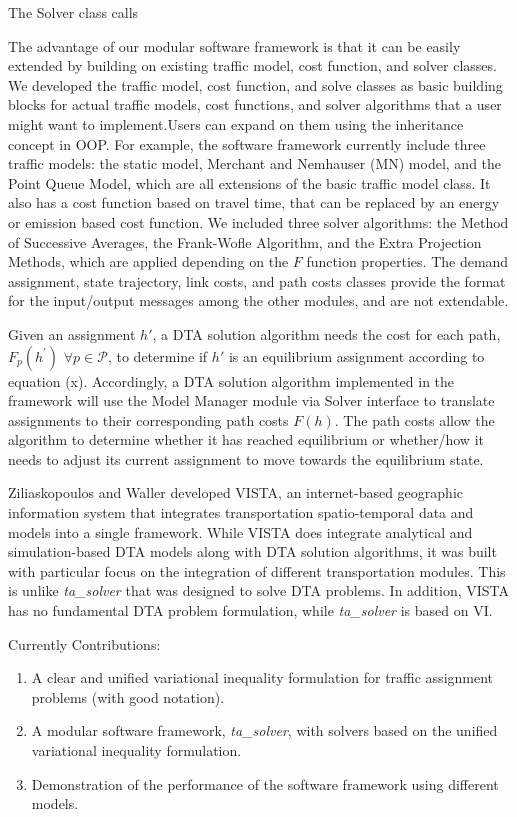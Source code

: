 The Solver class calls 

The advantage of our modular software framework is that it can be easily extended by building on existing traffic model, cost function, and solver classes. We developed the traffic model, cost function, and solve classes as basic building blocks for actual traffic models, cost functions, and solver algorithms that a user might want to implement.Users can expand on them using the inheritance concept in OOP. For example, the software framework currently include three traffic models: the static model, Merchant and Nemhauser (MN) model, and the Point Queue Model, which are all extensions of the basic traffic model class. It also has a cost function based on travel time, that can be replaced by an energy or emission based cost function. We included three solver algorithms: the Method of Successive Averages, the Frank-Wofle Algorithm, and the Extra Projection Methods, which are applied depending on the $F$ function properties. The demand assignment, state trajectory, link costs, and path costs classes provide the format for the input/output messages among the other modules, and are not extendable.  

Given an assignment $h'$, a DTA solution algorithm needs the cost for each path, $F_p(h^')$ $\forall p\in\mathcal{P}$, to determine if $h'$ is an equilibrium assignment according to equation (x). Accordingly, a DTA solution algorithm implemented in the framework will use the Model Manager module via Solver interface to translate assignments to their corresponding path costs $F(h)$. The path costs allow the algorithm to determine whether it has reached equilibrium or whether/how it needs to adjust its current assignment to move towards the equilibrium state.

\item Ziliaskopoulos and Waller developed VISTA,
an internet-based geographic information system that integrates transportation spatio-temporal data and models into a single framework. While VISTA does integrate analytical and simulation-based DTA models along with DTA solution algorithms, it was built with particular focus on the integration of different transportation modules. This is unlike \textit{ta\_solver} that was designed to solve DTA problems. In addition, VISTA has no fundamental DTA problem formulation, while \textit{ta\_solver} is based on VI. 

Currently
Contributions:
\begin{enumerate}
\item A clear and unified variational inequality formulation for traffic assignment problems (with good notation).
\item A modular software framework, \textit{ta\_solver},  with solvers based on the unified variational inequality formulation.
\item Demonstration of the performance of the software framework using different models.
\end{enumerate}